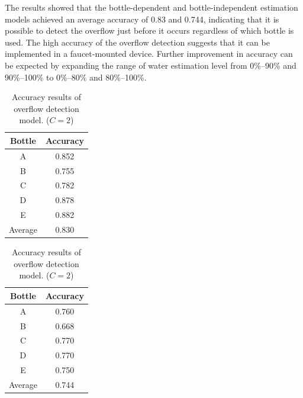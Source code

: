\documentclass[manuscript,screen,review]{acmart}
\begin{document}
The results showed that the bottle-dependent and bottle-independent estimation models achieved an average accuracy of 0.83 and 0.744, indicating that it is possible to detect the overflow just before it occurs regardless of which bottle is used. The high accuracy of the overflow detection suggests that it can be implemented in a faucet-mounted device. Further improvement in accuracy can be expected by expanding the range of water estimation level from 0\%--90\% and 90\%--100\% to 0\%--80\% and 80\%--100\%.

\begin{table}[!t]
  \small
  \centering
  \caption{Accuracy results of overflow detection model. ($C=2$)}
  \begin{minipage}[t]{0.45\linewidth}
    \centering
    \begin{tabular}{c|c} \hline\hline
    Bottle & Accuracy \\ \hline
    A & 0.852 \\
    B & 0.755 \\
    C & 0.782 \\
    D & 0.878 \\
    E & 0.882 \\ \hline
    Average & 0.830 \\ \hline
    \end{tabular}
    \label{tab:result_2_dependent}
  \end{minipage}
  \begin{minipage}[t]{0.45\linewidth}
    \centering
    \begin{tabular}{c|c} \hline\hline
    Bottle & Accuracy \\ \hline
    A & 0.760 \\
    B & 0.668 \\
    C & 0.770 \\
    D & 0.770 \\
    E & 0.750 \\ \hline
    Average & 0.744 \\ \hline
    \end{tabular}
    \label{tab:result_2_independent}
  \end{minipage}
  \label{tab:result_2}
\end{table}



\end{document}
